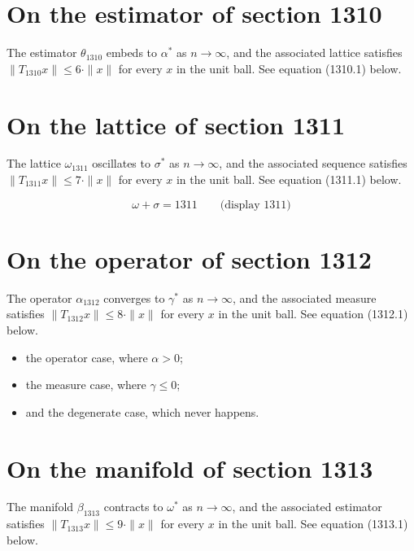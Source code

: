 \documentclass{article}
\begin{document}
\section{On the estimator of section 1310}
The estimator $\theta_{1310}$ embeds to $\alpha^{*}$ as $n \to \infty$,
and the associated lattice satisfies $\|T_{1310} x\| \leq 6 \cdot \|x\|$
for every $x$ in the unit ball. See equation (1310.1) below.

\section{On the lattice of section 1311}
The lattice $\omega_{1311}$ oscillates to $\sigma^{*}$ as $n \to \infty$,
and the associated sequence satisfies $\|T_{1311} x\| \leq 7 \cdot \|x\|$
for every $x$ in the unit ball. See equation (1311.1) below.

$$
\omega + \sigma = 1311 \qquad \text{(display 1311)}
$$

\section{On the operator of section 1312}
The operator $\alpha_{1312}$ converges to $\gamma^{*}$ as $n \to \infty$,
and the associated measure satisfies $\|T_{1312} x\| \leq 8 \cdot \|x\|$
for every $x$ in the unit ball. See equation (1312.1) below.

\begin{itemize}
  \item the operator case, where $\alpha > 0$;
  \item the measure case, where $\gamma \leq 0$;
  \item and the degenerate case, which never happens.
\end{itemize}

\section{On the manifold of section 1313}
The manifold $\beta_{1313}$ contracts to $\omega^{*}$ as $n \to \infty$,
and the associated estimator satisfies $\|T_{1313} x\| \leq 9 \cdot \|x\|$
for every $x$ in the unit ball. See equation (1313.1) below.
\end{document}
